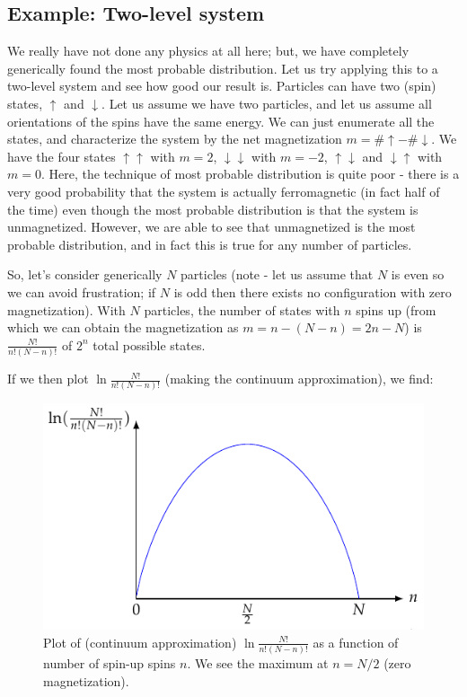 \subsection{Example: Two-level system}
We really have not done any physics at all here; but, we have completely generically found the most probable distribution. Let us try applying this to a two-level system and see how good our result is. Particles can have two (spin) states, $\uparrow$ and $\downarrow$. Let us assume we have two particles, and let us assume all orientations of the spins have the same energy. We can just enumerate all the states, and characterize the system by the net magnetization $m = \# \uparrow - \# \downarrow$. We have the four states $\uparrow \uparrow$ with $m = 2$, $\downarrow \downarrow$ with $m = -2$, $\uparrow\downarrow$ and $\downarrow \uparrow$ with $m = 0$. Here, the technique of most probable distribution is quite poor - there is a very good probability that the system is actually ferromagnetic (in fact half of the time) even though the most probable distribution is that the system is unmagnetized. However, we are able to see that unmagnetized is the most probable distribution, and in fact this is true for any number of particles.

So, let's consider generically $N$ particles (note - let us assume that $N$ is even so we can avoid frustration; if $N$ is odd then there exists no configuration with zero magnetization). With $N$ particles, the number of states with $n$ spins up (from which we can obtain the magnetization as $m = n - (N - n) = 2n - N$) is $\frac{N!}{n!(N-n)!}$ of $2^n$ total possible states.

If we then plot $\ln \frac{N!}{n!(N-n)!}$ (making the continuum approximation), we find:

\begin{figure}[htbp]
    \centering

    \includegraphics[]{Images/fig-TLSstatecounting.pdf}
    
    \caption{Plot of (continuum approximation) $\ln\frac{N!}{n!(N-n)!}$ as a function of number of spin-up spins $n$. We see the maximum at $n = N/2$ (zero magnetization).}
    \label{fig-TLSstatecounting}
\end{figure}

